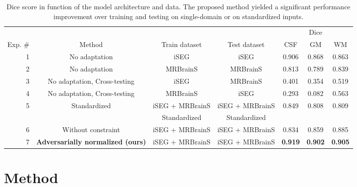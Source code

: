 \documentclass{article}
\begin{document}
\begin{table*}[t!]
  \centering
  \begin{small}
  \begin{tabular}{r*{6}{c}}
    \toprule
    &  &  & & \multicolumn{3}{c}{Dice} \\
     \cmidrule(lr){5-7}
    Exp. \# & Method & Train dataset & Test dataset & CSF & GM & WM \\
    \midrule
    1 & No adaptation & iSEG & iSEG & 0.906  & 0.868 & 0.863 \\
    2 & No adaptation & MRBrainS & MRBrainS & 0.813 & 0.789 & 0.839 \\
    3 & No adaptation, Cross-testing & iSEG & MRBrainS & 0.401 & 0.354 & 0.519  \\
    4 & No adaptation, Cross-testing & MRBrainS & iSEG & 0.293 & 0.082 & 0.563  \\
      \midrule
    5 & Standardized & iSEG + MRBrainS & iSEG + MRBrainS & 0.849 & 0.808 & 0.809 \\
    & & Standardized & Standardized & & & \\
    6 & Without constraint & iSEG + MRBrainS & iSEG + MRBrainS & 0.834  & 0.859 & 0.885 \\
    7 & {\textbf{Adversarially normalized (ours)}} & iSEG + MRBrainS & iSEG + MRBrainS & \textbf{0.919} & \textbf{0.902} & \textbf{0.905} \\
    \bottomrule
  \end{tabular}
  \end{small}
  \caption{Dice score in function of the model architecture and data. The proposed method yielded a significant performance improvement over training and testing on single-domain or on standardized inputs.}\label{tlc}
\end{table*}

\section{Method}
\end{document}
